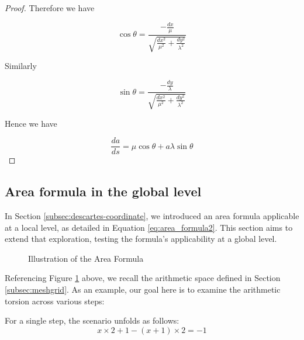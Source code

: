 \begin{proof}
Therefore we have

$$
\cos \theta = \frac{-\frac{dx}{\mu}}{\sqrt{\frac{dx^2}{\mu^2} + \frac{dy^2}{\lambda^2}}}
$$

Similarly

$$
\sin \theta = \frac{-\frac{dy}{\lambda}}{\sqrt{\frac{dx^2}{\mu^2} + \frac{dy^2}{\lambda^2}}}
$$

Hence we have

$$
\frac{da}{ds} = \mu \cos \theta + a \lambda \sin \theta
$$

\end{proof}

\subsection{Area formula in the global level}

In Section \ref{subsec:descartes-coordinate}, we introduced an area formula applicable at a local level, as detailed in Equation \eqref{eq:area_formula2}.
This section aims to extend that exploration, testing the formula's applicability at a global level.

\begin{figure}[ht]
    \centering
    \caption{Illustration of the Area Formula}\label{fig:area-formula}
\end{figure}

Referencing Figure \ref{fig:area-formula} above, we recall the arithmetic space defined in Section \ref{subsec:meshgrid}.
As an example, our goal here is to examine the arithmetic torsion across various steps:

For a single step, the scenario unfolds as follows:
\begin{equation}
    x \times 2 + 1 - (x + 1) \times 2 = -1
\end{equation}

